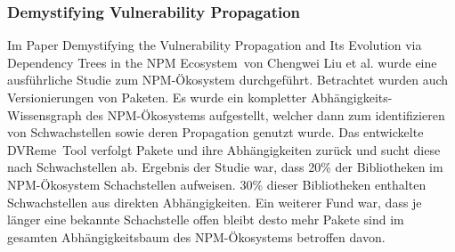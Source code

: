 \subsubsection{Demystifying Vulnerability Propagation} \label{sec:DVP}
Im Paper \glqq Demystifying the Vulnerability Propagation and Its Evolution via Dependency Trees in the NPM Ecosystem\grqq~von Chengwei Liu et al. wurde eine ausführliche Studie zum NPM-Ökosystem durchgeführt.
Betrachtet wurden auch Versionierungen von Paketen.
Es wurde ein kompletter Abhängigkeits-Wissensgraph des NPM-Ökosystems aufgestellt, welcher dann zum identifizieren von Schwachstellen sowie deren Propagation genutzt wurde.
Das entwickelte \glqq DVReme\grqq~Tool verfolgt Pakete und ihre Abhängigkeiten zurück und sucht diese nach Schwachstellen ab.
Ergebnis der Studie war, dass 20\% der Bibliotheken im NPM-Ökosystem Schachstellen aufweisen.
30\% dieser Bibliotheken enthalten Schwachstellen aus direkten Abhängigkeiten.
Ein weiterer Fund war, dass je länger eine bekannte Schachstelle offen bleibt desto mehr Pakete sind im gesamten Abhängigkeitsbaum des NPM-Ökosystems betroffen davon. 